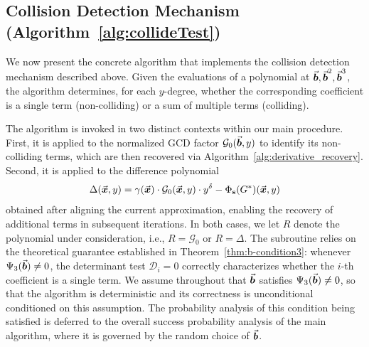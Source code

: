 \documentclass{article}
\numberwithin{equation}{section}
\begin{document}
\subsection{Collision Detection Mechanism (Algorithm~\ref{alg:collideTest})}
\label{sec:collision}

We now present the concrete algorithm that implements the collision detection mechanism described above. Given the evaluations of a polynomial at $\vec{\boldsymbol{b}}, \vec{\boldsymbol{b}}^2, \vec{\boldsymbol{b}}^3$, the algorithm determines, for each $y$-degree, whether the corresponding coefficient is a single term (non-colliding) or a sum of multiple terms (colliding).

The algorithm is invoked in two distinct contexts within our main procedure. First, it is applied to the normalized GCD factor $\mathcal{G}_0(\vec{\boldsymbol{b}}, y)$ to identify its non-colliding terms, which are then recovered via Algorithm~\ref{alg:derivative_recovery}. Second, it is applied to the difference polynomial
\[
\Delta(\vec{\boldsymbol{x}}, y) = \gamma(\vec{\boldsymbol{x}}) \cdot \mathcal{G}_0(\vec{\boldsymbol{x}}, y) \cdot y^{\delta} - \Phi_{\mathbf{s}}(G^*)(\vec{\boldsymbol{x}}, y)
\]
obtained after aligning the current approximation, enabling the recovery of additional terms in subsequent iterations. In both cases, we let $R$ denote the polynomial under consideration, i.e., $R = \mathcal{G}_0$ or $R = \Delta$. The subroutine relies on the theoretical guarantee established in Theorem~\ref{thm:b-condition3}: whenever $\Psi_3(\vec{\boldsymbol{b}}) \neq 0$, the determinant test $\mathcal{D}_i = 0$ correctly characterizes whether the $i$-th coefficient is a single term. We assume throughout that $\vec{\boldsymbol{b}}$ satisfies $\Psi_3(\vec{\boldsymbol{b}}) \neq 0$, so that the algorithm is deterministic and its correctness is unconditional conditioned on this assumption. The probability analysis of this condition being satisfied is deferred to the overall success probability analysis of the main algorithm, where it is governed by the random choice of $\vec{\boldsymbol{b}}$.
\end{document}
